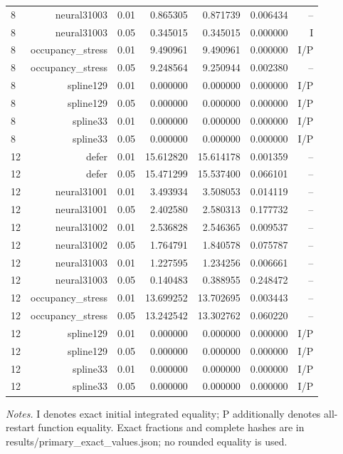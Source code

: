 {\begin{longtable}{lrrrrrr}
8 & neural31003 & 0.01 & 0.865305 & 0.871739 & 0.006434 & -- \\
8 & neural31003 & 0.05 & 0.345015 & 0.345015 & 0.000000 & I \\
8 & occupancy\_stress & 0.01 & 9.490961 & 9.490961 & 0.000000 & I/P \\
8 & occupancy\_stress & 0.05 & 9.248564 & 9.250944 & 0.002380 & -- \\
8 & spline129 & 0.01 & 0.000000 & 0.000000 & 0.000000 & I/P \\
8 & spline129 & 0.05 & 0.000000 & 0.000000 & 0.000000 & I/P \\
8 & spline33 & 0.01 & 0.000000 & 0.000000 & 0.000000 & I/P \\
8 & spline33 & 0.05 & 0.000000 & 0.000000 & 0.000000 & I/P \\
12 & defer & 0.01 & 15.612820 & 15.614178 & 0.001359 & -- \\
12 & defer & 0.05 & 15.471299 & 15.537400 & 0.066101 & -- \\
12 & neural31001 & 0.01 & 3.493934 & 3.508053 & 0.014119 & -- \\
12 & neural31001 & 0.05 & 2.402580 & 2.580313 & 0.177732 & -- \\
12 & neural31002 & 0.01 & 2.536828 & 2.546365 & 0.009537 & -- \\
12 & neural31002 & 0.05 & 1.764791 & 1.840578 & 0.075787 & -- \\
12 & neural31003 & 0.01 & 1.227595 & 1.234256 & 0.006661 & -- \\
12 & neural31003 & 0.05 & 0.140483 & 0.388955 & 0.248472 & -- \\
12 & occupancy\_stress & 0.01 & 13.699252 & 13.702695 & 0.003443 & -- \\
12 & occupancy\_stress & 0.05 & 13.242542 & 13.302762 & 0.060220 & -- \\
12 & spline129 & 0.01 & 0.000000 & 0.000000 & 0.000000 & I/P \\
12 & spline129 & 0.05 & 0.000000 & 0.000000 & 0.000000 & I/P \\
12 & spline33 & 0.01 & 0.000000 & 0.000000 & 0.000000 & I/P \\
12 & spline33 & 0.05 & 0.000000 & 0.000000 & 0.000000 & I/P \\
\bottomrule\end{longtable}}
\noindent\emph{Notes.} I denotes exact initial integrated equality; P additionally denotes all-restart function equality. Exact fractions and complete hashes are in results/primary\_exact\_values.json; no rounded equality is used.
